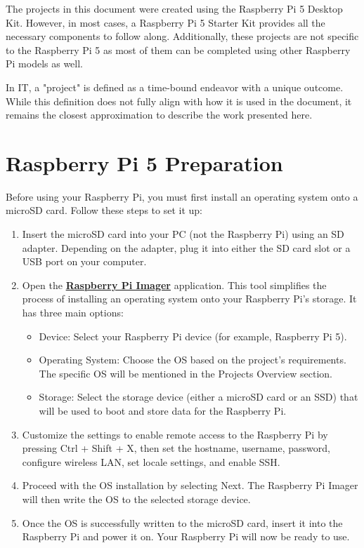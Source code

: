\documentclass[a4paper,12pt]{article}
\begin{document}
The projects in this document were created using the Raspberry Pi 5 Desktop Kit. However, in most cases, a Raspberry Pi 5 Starter Kit provides all the necessary components to follow along. Additionally, these projects are not specific to the Raspberry Pi 5 as most of them can be completed using other Raspberry Pi models as well.  

In IT, a "project" is defined as a time-bound endeavor with a unique outcome. While this definition does not fully align with how it is used in the document, it remains the closest approximation to describe the work presented here.

\section*{Raspberry Pi 5 Preparation}

Before using your Raspberry Pi, you must first install an operating system onto a microSD card. Follow these steps to set it up:
\begin{enumerate}
    \item Insert the microSD card into your PC (not the Raspberry Pi) using an SD adapter. Depending on the adapter, plug it into either the SD card slot or a USB port on your computer.
    \item Open the \href{https://www.raspberrypi.com/software}{\textbf{\color{blue}Raspberry Pi Imager}} application. This tool simplifies the process of installing an operating system onto your Raspberry Pi’s storage. It has three main options:
    \begin{itemize}
        \item Device: Select your Raspberry Pi device (for example, Raspberry Pi 5).
        \item Operating System: Choose the OS based on the project’s requirements. The specific OS will be mentioned in the Projects Overview section.
        \item Storage: Select the storage device (either a microSD card or an SSD) that will be used to boot and store data for the Raspberry Pi.
    \end{itemize}
    \item Customize the settings to enable remote access to the Raspberry Pi by pressing Ctrl + Shift + X, then set the hostname, username, password, configure wireless LAN, set locale settings, and enable SSH.
    \item Proceed with the OS installation by selecting Next. The Raspberry Pi Imager will then write the OS to the selected storage device.
    \item Once the OS is successfully written to the microSD card, insert it into the Raspberry Pi and power it on. Your Raspberry Pi will now be ready to use.
\end{enumerate}
\end{document}

